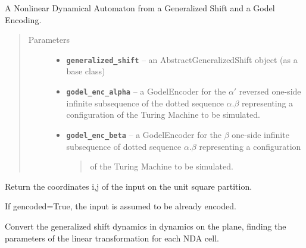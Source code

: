 \documentclass[letterpaper,10pt,english]{sphinxmanual}
\begin{document}
\begin{fulllineitems}
\label{symdyn_docs:symdyn.NonlinearDynamicalAutomaton}
A Nonlinear Dynamical Automaton from a Generalized Shift and a Godel
Encoding.
\begin{quote}\begin{description}
\item[{Parameters}] \leavevmode\begin{itemize}
\item {} 
\textbf{\texttt{generalized\_shift}} -- an AbstractGeneralizedShift object (as a
base class)

\item {} 
\textbf{\texttt{godel\_enc\_alpha}} -- a GodelEncoder for the \(\alpha
'\) reversed one-side infinite subsequence of the dotted
sequence \(\alpha . \beta\) representing a
configuration of the Turing Machine to be simulated.

\item {} 
\textbf{\texttt{godel\_enc\_beta}} -- 
a GodelEncoder for the \(\beta\)
one-side infinite subsequence of dotted sequence
\(\alpha . \beta\) representing a configuration
\begin{quote}

of the Turing Machine to be simulated.
\end{quote}


\end{itemize}

\end{description}\end{quote}

\begin{fulllineitems}
\label{symdyn_docs:symdyn.NonlinearDynamicalAutomaton.check_cell}
Return the coordinates i,j  of the input on the unit square
partition.

If gencoded=True, the input is assumed to be already encoded.

\end{fulllineitems}


\begin{fulllineitems}
\label{symdyn_docs:symdyn.NonlinearDynamicalAutomaton.find_flow_parameters}
Convert the generalized shift dynamics in dynamics on the plane,
finding the parameters of the linear transformation for each NDA
cell.


\end{fulllineitems}
\end{fulllineitems}
\end{document}
